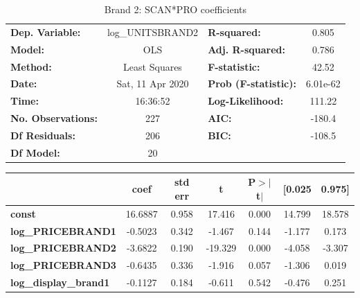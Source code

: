 \documentclass[a4paper,11pt]{article}
\begin{document}
\begin{center}
\begin{table}
\caption{Brand 2: SCAN*PRO coefficients}
\begin{tabular}{lclc}
\toprule
\textbf{Dep. Variable:}        & log\_UNITSBRAND2 & \textbf{  R-squared:         } &     0.805   \\
\textbf{Model:}                &       OLS        & \textbf{  Adj. R-squared:    } &     0.786   \\
\textbf{Method:}               &  Least Squares   & \textbf{  F-statistic:       } &     42.52   \\
\textbf{Date:}                 & Sat, 11 Apr 2020 & \textbf{  Prob (F-statistic):} &  6.01e-62   \\
\textbf{Time:}                 &     16:36:52     & \textbf{  Log-Likelihood:    } &    111.22   \\
\textbf{No. Observations:}     &         227      & \textbf{  AIC:               } &    -180.4   \\
\textbf{Df Residuals:}         &         206      & \textbf{  BIC:               } &    -108.5   \\
\textbf{Df Model:}             &          20      & \textbf{                     } &             \\
\bottomrule
\end{tabular}
\end{table}
\begin{tabular}{lcccccc}
                               & \textbf{coef} & \textbf{std err} & \textbf{t} & \textbf{P$> |$t$|$} & \textbf{[0.025} & \textbf{0.975]}  \\
\midrule
\textbf{const}                 &      16.6887  &        0.958     &    17.416  &         0.000        &       14.799    &       18.578     \\
\textbf{log\_PRICEBRAND1}      &      -0.5023  &        0.342     &    -1.467  &         0.144        &       -1.177    &        0.173     \\
\textbf{log\_PRICEBRAND2}      &      -3.6822  &        0.190     &   -19.329  &         0.000        &       -4.058    &       -3.307     \\
\textbf{log\_PRICEBRAND3}      &      -0.6435  &        0.336     &    -1.916  &         0.057        &       -1.306    &        0.019     \\
\textbf{log\_display\_brand1}  &      -0.1127  &        0.184     &    -0.611  &         0.542        &       -0.476    &        0.251     \\

\end{tabular}
\end{center}
\end{document}
